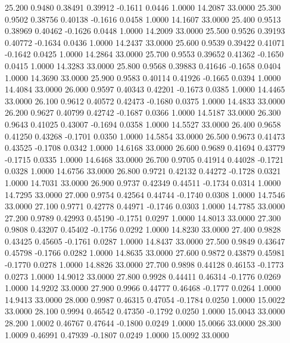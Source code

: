   25.200   0.9480   0.38491   0.39912  -0.1611   0.0446   1.0000  14.2087  33.0000
  25.300   0.9502   0.38756   0.40138  -0.1616   0.0458   1.0000  14.1607  33.0000
  25.400   0.9513   0.38969   0.40462  -0.1626   0.0448   1.0000  14.2009  33.0000
  25.500   0.9526   0.39193   0.40772  -0.1634   0.0436   1.0000  14.2437  33.0000
  25.600   0.9539   0.39422   0.41071  -0.1642   0.0425   1.0000  14.2864  33.0000
  25.700   0.9553   0.39652   0.41362  -0.1650   0.0415   1.0000  14.3283  33.0000
  25.800   0.9568   0.39883   0.41646  -0.1658   0.0404   1.0000  14.3690  33.0000
  25.900   0.9583   0.40114   0.41926  -0.1665   0.0394   1.0000  14.4084  33.0000
  26.000   0.9597   0.40343   0.42201  -0.1673   0.0385   1.0000  14.4465  33.0000
  26.100   0.9612   0.40572   0.42473  -0.1680   0.0375   1.0000  14.4833  33.0000
  26.200   0.9627   0.40799   0.42742  -0.1687   0.0366   1.0000  14.5187  33.0000
  26.300   0.9643   0.41025   0.43007  -0.1694   0.0358   1.0000  14.5527  33.0000
  26.400   0.9658   0.41250   0.43268  -0.1701   0.0350   1.0000  14.5854  33.0000
  26.500   0.9673   0.41473   0.43525  -0.1708   0.0342   1.0000  14.6168  33.0000
  26.600   0.9689   0.41694   0.43779  -0.1715   0.0335   1.0000  14.6468  33.0000
  26.700   0.9705   0.41914   0.44028  -0.1721   0.0328   1.0000  14.6756  33.0000
  26.800   0.9721   0.42132   0.44272  -0.1728   0.0321   1.0000  14.7031  33.0000
  26.900   0.9737   0.42349   0.44511  -0.1734   0.0314   1.0000  14.7295  33.0000
  27.000   0.9754   0.42564   0.44744  -0.1740   0.0308   1.0000  14.7546  33.0000
  27.100   0.9771   0.42778   0.44971  -0.1746   0.0303   1.0000  14.7785  33.0000
  27.200   0.9789   0.42993   0.45190  -0.1751   0.0297   1.0000  14.8013  33.0000
  27.300   0.9808   0.43207   0.45402  -0.1756   0.0292   1.0000  14.8230  33.0000
  27.400   0.9828   0.43425   0.45605  -0.1761   0.0287   1.0000  14.8437  33.0000
  27.500   0.9849   0.43647   0.45798  -0.1766   0.0282   1.0000  14.8635  33.0000
  27.600   0.9872   0.43879   0.45981  -0.1770   0.0278   1.0000  14.8826  33.0000
  27.700   0.9898   0.44128   0.46153  -0.1773   0.0273   1.0000  14.9012  33.0000
  27.800   0.9928   0.44411   0.46314  -0.1776   0.0269   1.0000  14.9202  33.0000
  27.900   0.9966   0.44777   0.46468  -0.1777   0.0264   1.0000  14.9413  33.0000
  28.000   0.9987   0.46315   0.47054  -0.1784   0.0250   1.0000  15.0022  33.0000
  28.100   0.9994   0.46542   0.47350  -0.1792   0.0250   1.0000  15.0043  33.0000
  28.200   1.0002   0.46767   0.47644  -0.1800   0.0249   1.0000  15.0066  33.0000
  28.300   1.0009   0.46991   0.47939  -0.1807   0.0249   1.0000  15.0092  33.0000
